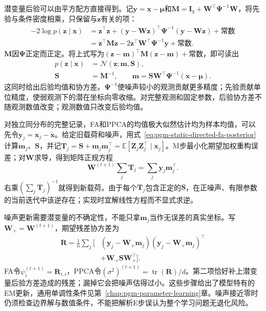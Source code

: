 潜变量后验可以由平方配方直接得到。记$\bm{y}=\bm{x}-\bm{\mu}$和$\bm{M}=\bm{I}_q+\bm{W}^{\top}\bm{\Psi}^{-1}\bm{W}$，将先验与条件密度相乘，只保留与$\bm{z}$有关的项：
\[
  \begin{aligned}
    -2\log p(\bm{z}\mid\bm{x})
      &=\bm{z}^{\top}\bm{z}
       +(\bm{y}-\bm{W}\bm{z})^{\top}
          \bm{\Psi}^{-1}(\bm{y}-\bm{W}\bm{z})
       +\text{常数}\\
      &=\bm{z}^{\top}\bm{M}\bm{z}
       -2\bm{z}^{\top}\bm{W}^{\top}\bm{\Psi}^{-1}\bm{y}
       +\text{常数}.
  \end{aligned}
\]
$\bm{M}$因$\bm{\Psi}$正定而正定。将上式写为$(\bm{z}-\bm{m})^{\top}\bm{M}(\bm{z}-\bm{m})+\text{常数}$，即可读出
\begin{equation}
  \label{eq:pgm-static-directed-fa-posterior}
  \begin{aligned}
    p(\bm{z}\mid\bm{x})&=\mathcal{N}(\bm{z};\bm{m},\bm{S}),\\
    \bm{S}&=\bm{M}^{-1},\qquad
    \bm{m}=\bm{S}\bm{W}^{\top}\bm{\Psi}^{-1}
                  (\bm{x}-\bm{\mu}).
  \end{aligned}
\end{equation}
这同时给出后验均值和协方差。$\bm{\Psi}^{-1}$使噪声较小的观测贡献更多精度；先验贡献单位精度，使弱观测下的潜在坐标向零收缩。对完整观测和固定参数，后验协方差不随观测数值改变；观测数值只改变后验均值。

对独立同分布的完整记录，FA和PPCA的均值极大似然估计均为样本均值，可以先令$\bm{y}_j=\bm{x}_j-\overline{\bm{x}}$。给定旧载荷和噪声，用式~\eqref{eq:pgm-static-directed-fa-posterior}计算$\bm{m}_j$、$\bm{S}$，并记$\bm{T}_j=\bm{S}+\bm{m}_j\bm{m}_j^\top=\mathbb{E}[\bm{Z}_j\bm{Z}_j^\top\mid\bm{x}_j]$。M步最小化期望加权重构误差；对$\bm{W}$求导，得到矩阵正规方程
\[
  \bm{W}^{(t+1)}\sum_j\bm{T}_j
     =\sum_j\bm{y}_j\bm{m}_j^\top.
\]
右乘$\left(\sum_j\bm{T}_j\right)^{-1}$就得到新载荷。由于每个$\bm{T}_j$包含正定的$\bm{S}$，在正噪声、有限参数的当前迭代中该逆存在；实现时宜解线性方程而不显式求逆。

噪声更新需要潜变量的不确定性，不能只拿$\bm{m}_j$当作无误差的真实坐标。写$\bm{W}_{+}=\bm{W}^{(t+1)}$，期望残差协方差为
\begin{equation}
  \label{eq:pgm-static-directed-fa-residual}
  \begin{aligned}
    \bm{R}=\frac1n\sum_j\bigl[
      &(\bm{y}_j-\bm{W}_{+}\bm{m}_j)
       (\bm{y}_j-\bm{W}_{+}\bm{m}_j)^\top\\
      &+\bm{W}_{+}\bm{S}\bm{W}_{+}^\top
    \bigr].
  \end{aligned}
\end{equation}
FA令$\psi_i^{(t+1)}=\bm{R}_{i,i}$，PPCA令$(\sigma^2)^{(t+1)}=\operatorname{tr}(\bm{R})/d$。第二项恰好补上潜变量后验方差造成的残差；漏掉它会把噪声估得过小。这些步骤给出了模型特有的EM更新，通用单调性条件见第~\ref{chap:pgm-parameter-learning}章。噪声接近零时仍须检查边界解与数值条件，不能把解析E步误认为整个学习问题无退化风险。

